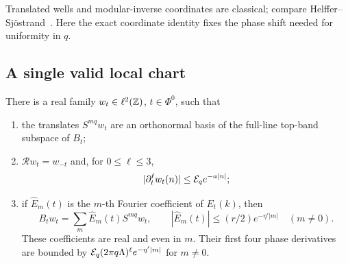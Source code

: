 Translated wells and modular-inverse coordinates are classical; compare Helffer--Sj\"ostrand~\cite[Section~5.1, especially (5.1.7)--(5.1.17)]{HSII}. Here the exact coordinate identity fixes the phase shift needed for uniformity in $q$.

\subsection{A single valid local chart}
\begin{lemma}\label{lem:Wannier}
There is a real family $w_t\in\ell^2(\mathbb Z)$, $t\in\Phi^0$, such that
\begin{enumerate}
\item the translates $S^{mq}w_t$ are an orthonormal basis of the full-line top-band subspace of $B_t$;
\item $\mathcal Rw_t=w_{-t}$ and, for $0\le\ell\le3$,
\begin{equation}\label{eq:Wanniertails}
 |\partial_t^\ell w_t(n)|\le\mathcal E_q e^{-a|n|};
\end{equation}
\item if $\widehat E_m(t)$ is the $m$-th Fourier coefficient of $E_t(k)$, then
\begin{equation}\label{eq:bandFourier}
 B_tw_t=\sum_m\widehat E_m(t)S^{mq}w_t,
 \qquad |\widehat E_m(t)|\le(r/2)e^{-\eta'|m|}\quad(m\ne0).
\end{equation}
These coefficients are real and even in $m$. Their first four phase derivatives are bounded by $\mathcal E_q(2\pi q\Lambda)^\ell e^{-\eta'|m|}$ for $m\ne0$.
\end{enumerate}
\end{lemma}

